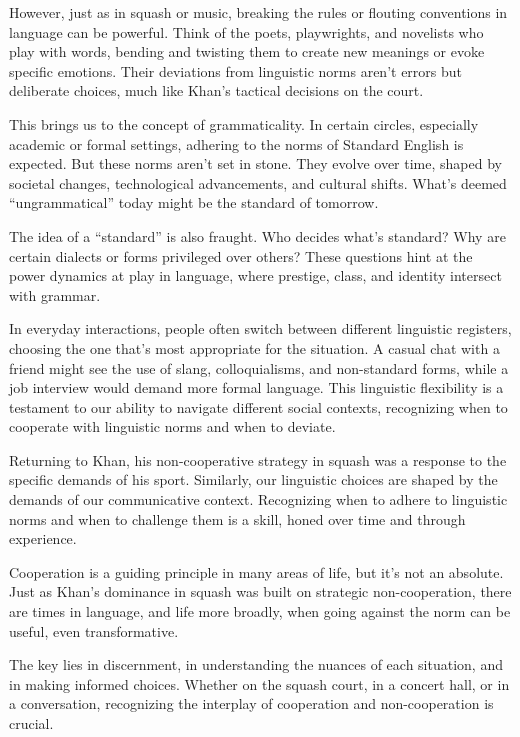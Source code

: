 However, just as in squash or music, breaking the rules or flouting conventions in language can be powerful. Think of the poets, playwrights, and novelists who play with words, bending and twisting them to create new meanings or evoke specific emotions. Their deviations from linguistic norms aren't errors but deliberate choices, much like Khan's tactical decisions on the court.

This brings us to the concept of grammaticality. In certain circles, especially academic or formal settings, adhering to the norms of Standard English is expected. But these norms aren't set in stone. They evolve over time, shaped by societal changes, technological advancements, and cultural shifts. What's deemed ``ungrammatical'' today might be the standard of tomorrow.

The idea of a ``standard'' is also fraught. Who decides what's standard? Why are certain dialects or forms privileged over others? These questions hint at the power dynamics at play in language, where prestige, class, and identity intersect with grammar.

In everyday interactions, people often switch between different linguistic registers, choosing the one that's most appropriate for the situation. A casual chat with a friend might see the use of slang, colloquialisms, and non-standard forms, while a job interview would demand more formal language. This linguistic flexibility is a testament to our ability to navigate different social contexts, recognizing when to cooperate with linguistic norms and when to deviate.

Returning to Khan, his non-cooperative strategy in squash was a response to the specific demands of his sport. Similarly, our linguistic choices are shaped by the demands of our communicative context. Recognizing when to adhere to linguistic norms and when to challenge them is a skill, honed over time and through experience.

Cooperation is a guiding principle in many areas of life, but it's not an absolute. Just as Khan's dominance in squash was built on strategic non-cooperation, there are times in language, and life more broadly, when going against the norm can be useful, even transformative.

The key lies in discernment, in understanding the nuances of each situation, and in making informed choices. Whether on the squash court, in a concert hall, or in a conversation, recognizing the interplay of cooperation and non-cooperation is crucial.

